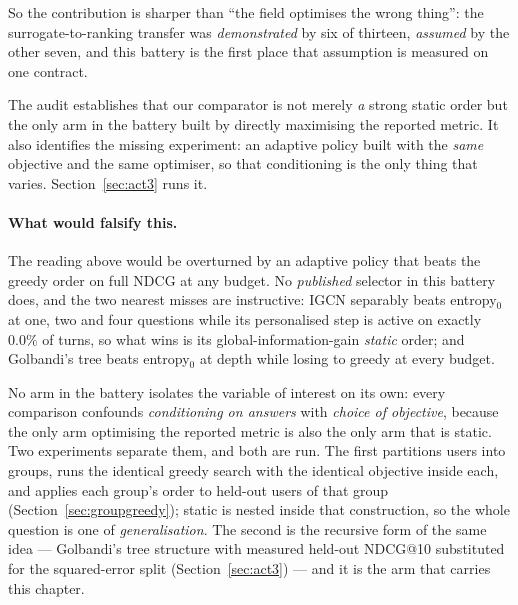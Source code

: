 \documentclass[11pt]{article}
\begin{document}
So the contribution is sharper than ``the field optimises the wrong thing'': the
surrogate-to-ranking transfer was \emph{demonstrated} by six of thirteen, \emph{assumed} by the other
seven, and this battery is the first place that assumption is measured on one contract.

The audit establishes that our comparator is not merely \emph{a} strong static order but the only
arm in the battery built by directly maximising the reported metric. It also identifies the missing experiment: an adaptive
policy built with the \emph{same} objective and the same optimiser, so that conditioning is the only
thing that varies. Section~\ref{sec:act3} runs it.

\paragraph{What would falsify this.} The reading above would be
overturned by an adaptive policy that beats the greedy order on full NDCG at any budget. No
\emph{published} selector in this battery does, and the two nearest misses are instructive: IGCN separably beats entropy$_0$ at one, two and four questions while its
personalised step is active on exactly $0.0\%$ of turns, so what wins is its
global-information-gain \emph{static} order; and Golbandi's tree beats entropy$_0$ at depth while
losing to greedy at every budget.

No arm in the battery isolates the variable of interest on its own: every comparison confounds
\emph{conditioning on answers} with \emph{choice of objective}, because the only arm optimising the
reported metric is also the only arm that is static. Two experiments separate them, and both are run.
The first partitions users into groups, runs the identical greedy search with the identical objective
inside each, and applies each group's order to held-out users of that group
(Section~\ref{sec:groupgreedy}); static is nested inside that construction, so the whole question is
one of \emph{generalisation}. The second is the recursive form of the same idea --- Golbandi's tree
structure with measured held-out NDCG@10 substituted for the squared-error split
(Section~\ref{sec:act3}) --- and it is the arm that carries this chapter.
\end{document}
